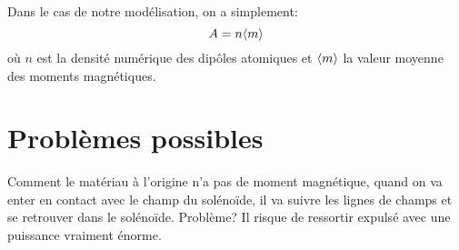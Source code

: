 \documentclass{article}
\newcommand{\valmoy}[1]{\mbox{\textlangle} #1\mbox{\textrangle}}
\begin{document}
Dans le cas de notre modélisation, on a simplement:
$$A = n \valmoy{m}$$ où $n$ est la densité numérique des dipôles atomiques et $\valmoy{m}$ la valeur moyenne des moments magnétiques.

\section{Problèmes possibles}
Comment le matériau à l'origine n'a pas de moment magnétique, quand on va enter en contact avec le champ du solénoïde, il va suivre les lignes de champs et se retrouver dans le solénoïde. Problème? Il risque de ressortir expulsé avec une puissance vraiment énorme.
\end{document}
